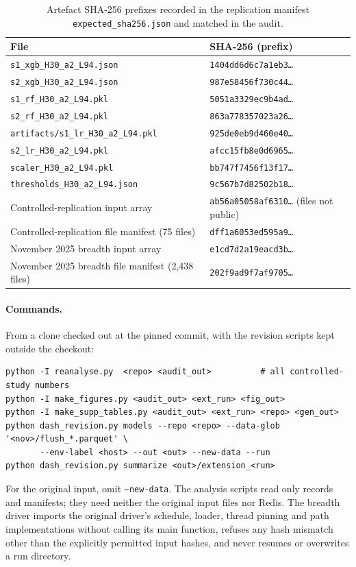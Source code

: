 \documentclass[10pt,a4paper]{article}
\begin{document}
\begin{table}[h]
\centering\small
\caption{Artefact SHA-256 prefixes recorded in the replication manifest \texttt{expected\_sha256.json} and matched in the audit.}\label{tab:hash}
\begin{tabular}{ll}
\toprule
File & SHA-256 (prefix) \\
\midrule
\texttt{s1\_xgb\_H30\_a2\_L94.json} & \texttt{1404dd6d6c7a1eb3\ldots} \\
\texttt{s2\_xgb\_H30\_a2\_L94.json} & \texttt{987e58456f730c44\ldots} \\
\texttt{s1\_rf\_H30\_a2\_L94.pkl} & \texttt{5051a3329ec9b4ad\ldots} \\
\texttt{s2\_rf\_H30\_a2\_L94.pkl} & \texttt{863a778357023a26\ldots} \\
\texttt{artifacts/s1\_lr\_H30\_a2\_L94.pkl} & \texttt{925de0eb9d460e40\ldots} \\
\texttt{s2\_lr\_H30\_a2\_L94.pkl} & \texttt{afcc15fb8e0d6965\ldots} \\
\texttt{scaler\_H30\_a2\_L94.pkl} & \texttt{bb747f7456f13f17\ldots} \\
\texttt{thresholds\_H30\_a2\_L94.json} & \texttt{9c567b7d82502b18\ldots} \\
\midrule
Controlled-replication input array & \texttt{ab56a05058af6310\ldots} (files not public) \\
Controlled-replication file manifest (75 files) & \texttt{dff1a6053ed595a9\ldots} \\
November 2025 breadth input array & \texttt{e1cd7d2a19eacd3b\ldots} \\
November 2025 breadth file manifest (2,438 files) & \texttt{202f9ad9f7af9705\ldots} \\
\bottomrule
\end{tabular}
\end{table}

\paragraph{Commands.} From a clone checked out at the pinned commit, with the revision scripts kept outside the checkout:
\begin{verbatim}
python -I reanalyse.py  <repo> <audit_out>          # all controlled-study numbers
python -I make_figures.py <audit_out> <ext_run> <fig_out>
python -I make_supp_tables.py <audit_out> <ext_run> <repo> <gen_out>
python dash_revision.py models --repo <repo> --data-glob '<nov>/flush_*.parquet' \
       --env-label <host> --out <out> --new-data --run
python dash_revision.py summarize <out>/extension_<run>
\end{verbatim}
For the original input, omit \texttt{--new-data}. The analysis scripts read only records and manifests; they need neither the original input files nor Redis. The breadth driver imports the original driver's schedule, loader, thread pinning and path implementations without calling its main function, refuses any hash mismatch other than the explicitly permitted input hashes, and never resumes or overwrites a run directory.
\end{document}
